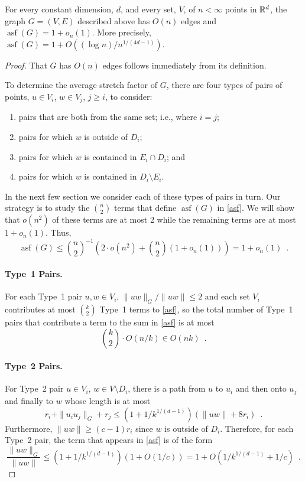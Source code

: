 \documentclass{patmorin}
\DeclareMathOperator{\asf}{asf}
\begin{document}
\begin{thm}
  For every constant dimension, $d$, and every set, $V$, of
  $n<\infty$ points in $\mathbb{R}^d$, the graph $G=(V,E)$ described above
  has $O(n)$ edges and $\asf(G)=1+o_n(1)$.  More precisely,
  $\asf(G)=1+O((\log n)/n^{1/(4d-1)})$.
\end{thm}

\begin{proof}
  That $G$ has $O(n)$ edges follows immediately from its definition.

  To determine the average stretch factor of $G$, there are four types
  of pairs of points, $u\in V_i$, $w\in V_j$, $j\ge i$, to consider:
  \begin{enumerate}
    \item pairs that are both from the same set; i.e., where $i=j$;
    \item pairs for which $w$ is outside of $D_i$;
    \item pairs for which $w$ is contained in $E_i\cap D_i$; and
    \item pairs for which $w$ is contained in $D_i\setminus E_i$.
  \end{enumerate}
  In the next few section we consider each of these types of pairs in
  turn.  Our strategy is to study the $\binom{n}{2}$ terms that define
  $\asf(G)$ in \eqref{asf}.  We will show that $o(n^2)$ of these terms
  are at most 2 while the remaining terms are at most $1+o_n(1)$.  Thus,
  \[
     \asf(G)\le \binom{n}{2}^{-1}\left(2\cdot o(n^2)
                                       +\binom{n}{2}(1+o_n(1))\right)
     = 1+o_n(1) \enspace .
  \]

  \paragraph{Type~1 Pairs.}
  For each Type~1 pair $u,w\in V_i$, $\|uw\|_G/\|uw\|\le 2$ and each set
  $V_i$ contributes at most $\binom{k}{2}$ Type~1 terms to \eqref{asf},
  so the total number of Type~1 pairs that contribute a term to the sum
  in \eqref{asf} is at most
  \[
    \binom{k}{2}\cdot O(n/k) \in O(nk)
      \enspace .
  \]

  \paragraph{Type~2 Pairs.}
  For Type~2 pair $u\in V_i$, $w\in V\setminus D_i$, there is a path
  from $u$ to $u_i$ and then onto $u_j$ and finally to $w$ whose length
  is at most
  \[
     r_i + \|u_iu_j\|_G + r_j
      \le (1+1/k^{1/(d-1)})(\|uw\| + 8r_i) \enspace .
  \]
  Furthermore, $\|uw\|\ge (c-1)r_i$ since $w$ is outside of $D_i$.
  Therefore, for each Type~2 pair, the term that appears in \eqref{asf}
  is of the form
  \[
    \frac{\|uw\|_G}{\|uw\|}\le (1+1/k^{1/(d-1)})(1+O(1/c)) 
       = 1+O(1/k^{1/(d-1)}+1/c) \enspace .
  \]


\end{proof}
\end{document}
